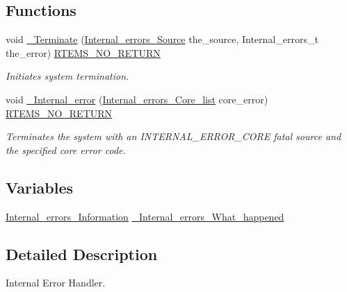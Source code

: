 \subsection*{Functions}
\begin{DoxyCompactItemize}
\item 
void \mbox{\hyperlink{group__RTEMSScoreIntErr_ga5102f2f0c5939020aa3b11d67afa84eb}{\+\_\+\+Terminate}} (\mbox{\hyperlink{group__RTEMSScoreIntErr_ga878b4de77df7d0b83d19609d4de42c26}{Internal\+\_\+errors\+\_\+\+Source}} the\+\_\+source, Internal\+\_\+errors\+\_\+t the\+\_\+error) \mbox{\hyperlink{group__RTEMSScoreBaseDefs_gaa2f0ed67aa174f684bb31b7e8bdb386f}{R\+T\+E\+M\+S\+\_\+\+N\+O\+\_\+\+R\+E\+T\+U\+RN}}
\begin{DoxyCompactList}\small\item\em Initiates system termination. \end{DoxyCompactList}\item 
void \mbox{\hyperlink{group__RTEMSScoreIntErr_ga092fa4be4bda2528754b494e901d3d2a}{\+\_\+\+Internal\+\_\+error}} (\mbox{\hyperlink{group__RTEMSScoreIntErr_ga55d1197d1b88e797ec344be41aa4f5fe}{Internal\+\_\+errors\+\_\+\+Core\+\_\+list}} core\+\_\+error) \mbox{\hyperlink{group__RTEMSScoreBaseDefs_gaa2f0ed67aa174f684bb31b7e8bdb386f}{R\+T\+E\+M\+S\+\_\+\+N\+O\+\_\+\+R\+E\+T\+U\+RN}}
\begin{DoxyCompactList}\small\item\em Terminates the system with an I\+N\+T\+E\+R\+N\+A\+L\+\_\+\+E\+R\+R\+O\+R\+\_\+\+C\+O\+RE fatal source and the specified core error code. \end{DoxyCompactList}\end{DoxyCompactItemize}
\subsection*{Variables}
\begin{DoxyCompactItemize}
\item 
\mbox{\hyperlink{structInternal__errors__Information}{Internal\+\_\+errors\+\_\+\+Information}} \mbox{\hyperlink{group__RTEMSScoreIntErr_gafd0fcab7e6e37b1b51ae12e24e2fad72}{\+\_\+\+Internal\+\_\+errors\+\_\+\+What\+\_\+happened}}
\end{DoxyCompactItemize}


\subsection{Detailed Description}
Internal Error Handler. 

